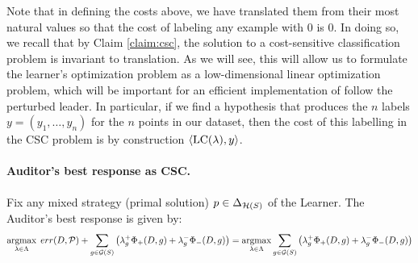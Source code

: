 \begin{remark}
  Note that in defining the costs above, we have translated them from
  their most natural values so that the cost of labeling any example
  with 0 is 0. In doing so, we recall that by Claim \ref{claim:csc},
  the solution to a cost-sensitive classification problem is invariant
  to translation. As we will see, this will allow us to formulate the
  learner's optimization problem as a low-dimensional linear
  optimization problem, which will be important for an efficient
  implementation of follow the perturbed leader. In particular, if we
  find a hypothesis that produces the $n$ labels
  $y = (y_1,\ldots,y_n)$ for the $n$ points in our dataset, then the
  cost of this labelling in the CSC problem is by construction
  $\langle \mathrm{LC}(\lambda), y \rangle$. 
\end{remark}

\paragraph{Auditor's best response as CSC.}

Fix any mixed strategy (primal solution) $p \in \Delta_{\mathcal{H}(S)}$ of
the Learner. The Auditor's best response is given by:
\begin{equation} \label{eq:abr} \operatorname*{\mathrm{argmax}}_{\lambda \in \Lambda} \;
  err(D, \mathcal{P}) + \sum_{g\in \mathcal{G}(S)} \left( \lambda_g^+ \Phi_+(D, g) +
    \lambda_g^- \Phi_-(D, g) \right) = \operatorname*{\mathrm{argmax}}_{\lambda \in \Lambda}
  \sum_{g\in \mathcal{G}(S)} \left( \lambda_g^+ \Phi_+(D, g) + \lambda_g^-
    \Phi_-(D, g) \right)
\end{equation}

